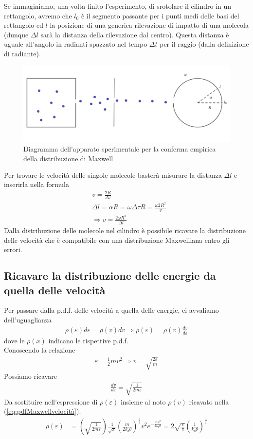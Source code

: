 \documentclass[
10pt, %
a4paper, %
oneside, %
headinclude,footinclude, %
BCOR5mm, %
]{scrartcl}
\begin{document}
Se immaginiamo, una volta finito l'esperimento, di srotolare il cilindro in un rettangolo, avremo che $l_0$ è il segmento passante per i punti medi delle basi del rettangolo ed $l$ la posizione di una generica rilevazione di impatto di una molecola (dunque $\Delta l$ sarà la distanza della rilevazione dal centro).  Questa distanza è uguale all'angolo in radianti spazzato nel tempo $\Delta t$ per il raggio (dalla definizione di radiante).
\begin{figure}[h!]
	\centering
	\includegraphics[width=0.9\linewidth]{../images/Esperimento_Maxwell}
	\caption{Diagramma dell'apparato sperimentale per la conferma empirica della distribuzione di Maxwell}
	\label{fig:esperimentomaxwell}
\end{figure}
\FloatBarrier
Per trovare le velocità delle singole molecole basterà misurare la distanza $\Delta l$ e inserirla nella formula
\begin{align*} 
	&v =\frac{2 R}{\Delta\tau}\\
	&\Delta l = \alpha R = \omega \Delta\tau R = \frac{\omega 2 R^2}{v}\\
	&\Rightarrow v = \frac{2\omega R^2}{\Delta l}
\end{align*} 
Dalla distribuzione delle molecole nel cilindro è possibile ricavare la distribuzione delle velocità che è compatibile con una distribuzione Maxwelliana entro gli errori.
\subsection{Ricavare la distribuzione delle energie da quella delle velocità}
Per passare dalla p.d.f. delle velocità a quella delle energie, ci avvaliamo dell'uguaglianza
\begin{align*} 
	\rho(\varepsilon)d\varepsilon = \rho(v)dv \Rightarrow \rho(\varepsilon) = \rho(v)\frac{dv}{d\varepsilon}
\end{align*} 
dove le $\rho(x)$ indicano le rispettive p.d.f.\\
Conoscendo la relazione
\begin{align*} 
	\varepsilon = \frac{1}{2}m v ^2 \Rightarrow v = \sqrt{\frac{2 \varepsilon}{m}}
\end{align*} 
Possiamo ricavare 
\begin{align*} 
	\frac{dv}{d\varepsilon} = \sqrt{\frac{1}{2 m \varepsilon}}
\end{align*} 
Da sostituire nell'espressione di $\rho(\varepsilon)$ insieme al noto $\rho(v)$ ricavato nella (\ref{eq:pdfMaxwellvelocità}).
\begin{align*} 
	\rho(\varepsilon)&= \left(\sqrt{\frac{1}{2 m \varepsilon}}\right) \frac{4}{\sqrt{\pi}}\left(\frac{m}{2k_b\theta}\right)^{\frac{3}{2}} v^2 e^{-\frac{mv^2}{2 k_b \theta}}= 2 \sqrt{\frac{\varepsilon}{\pi}} \left(\frac{1}{k_b \theta}\right)^{\frac{3}{2}}
\end{align*}  
\end{document}
